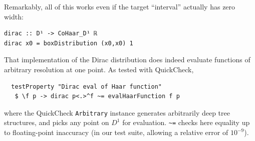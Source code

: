 \documentclass[sigplan,review,anonymous]{acmart}\settopmatter{printfolios=true,printccs=false,printacmref=false}
\theoremstyle{acmplain}
\theoremstyle{acmdefinition}
\begin{document}
Remarkably, all of this works even if the target “interval” actually has zero width:
\begin{lstlisting}
dirac :: D¹ -> CoHaar_D¹ ℝ
dirac x0 = boxDistribution (x0,x0) 1
\end{lstlisting}
That implementation of the Dirac distribution does indeed evaluate functions of arbitrary resolution at one point. As tested with QuickCheck,
\begin{lstlisting}
  testProperty "Dirac eval of Haar function"
   $ \f p -> dirac p<.>^f ~= evalHaarFunction f p
\end{lstlisting}
where the QuickCheck \lstinline`Arbitrary` instance generates arbitrarily deep tree structures, and picks any point on $D^1$ for evaluation. \lstinline`~=` checks here equality up to floating-point inaccuracy (in our test suite, allowing a relative error of $10^{-9}$).
\end{document}
